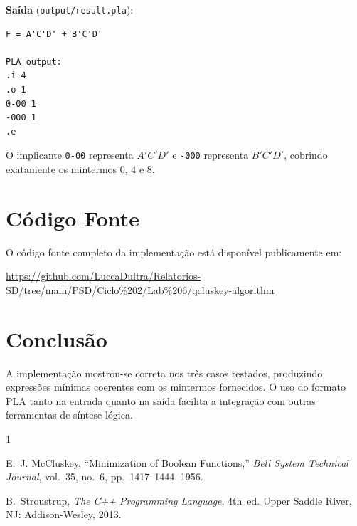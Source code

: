 \documentclass[conference]{IEEEtran}
\begin{document}
\noindent\textbf{Saída} (\texttt{output/result.pla}):
\begin{lstlisting}[style=pla]
F = A'C'D' + B'C'D'

PLA output:
.i 4
.o 1
0-00 1
-000 1
.e
\end{lstlisting}

O implicante \texttt{0-00} representa $A'C'D'$ e \texttt{-000} representa
$B'C'D'$, cobrindo exatamente os mintermos 0, 4 e 8.

\section{Código Fonte}

O código fonte completo da implementação está disponível publicamente em:

\begin{center}
\url{https://github.com/LuccaDultra/Relatorios-SD/tree/main/PSD/Ciclo\%202/Lab\%206/qcluskey-algorithm}
\end{center}

\section{Conclusão}

A implementação mostrou-se correta nos três casos testados, produzindo
expressões mínimas coerentes com os mintermos fornecidos. O uso do formato
PLA tanto na entrada quanto na saída facilita a integração com outras
ferramentas de síntese lógica.

\begin{thebibliography}{1}

E.~J. McCluskey, ``Minimization of Boolean Functions,''
\textit{Bell System Technical Journal}, vol.~35, no.~6,
pp.~1417--1444, 1956.

B.~Stroustrup, \textit{The C++ Programming Language}, 4th~ed.
Upper Saddle River, NJ: Addison-Wesley, 2013.

\end{thebibliography}
\end{document}
